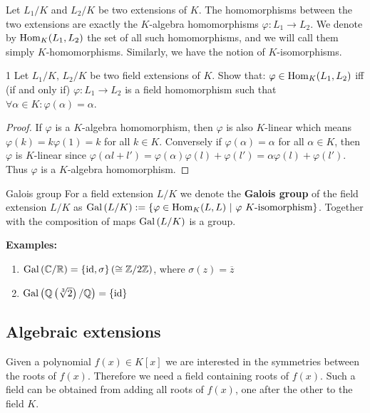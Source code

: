 \documentclass[twoside = false,	%
		headsepline,		%
		parskip = true,
		]{scrbook}						%
\begin{document}
        Let $L_1/K$ and $L_2/K$ be two extensions of $K$. The homomorphisms between the two extensions are exactly the $K$-algebra homomorphisms $\varphi: L_1 \rightarrow L_2$. We denote by $\mathrm{Hom}_K(L_1,L_2)$ the set of all such homomorphisms, and we will call them simply $K$-homomorphisms. Similarly, we have the notion of $K$-isomorphisms.
        
        \begin{exercise}{}{1}
                Let $L_1/K, \, L_2/K$ be two field extensions of $K$. Show that:
                $\varphi \in \mathrm{Hom}_K(L_1,L_2)$ iff (if and only if) $\varphi:L_1 \rightarrow L_2$ is a field homomorphism such that $\forall \alpha \in K: \varphi(\alpha) = \alpha$.
        \end{exercise}
        \begin{proof}
            If $\varphi$ is a $K$-algebra homomorphism, then $\varphi$ is also $K$-linear which means $\varphi(k) = k\varphi(1) = k$ for all $k \in K$. Conversely if $\varphi(\alpha)=\alpha$ for all $\alpha \in K$, then $\varphi$ is $K$-linear since $\varphi(\alpha l+l') = \varphi(\alpha) \varphi(l) + \varphi(l') = \alpha \varphi(l) + \varphi(l')$. Thus $\varphi$ is a $K$-algebra homomorphism.
        \end{proof}
        
        \begin{definition*}{Galois group}
                For a field extension $L/K$ we denote the \textbf{Galois group} of the field extension $L/K$ as $\mathrm{Gal}\left( L/K\right):= \{\varphi \in \mathrm{Hom}_K(L,L) \ | \ \varphi \ K\text{-isomorphism}\}$. Together with the composition of maps $\mathrm{Gal}\left( L/K\right)$ is a group.
        \end{definition*}
        \textbf{Examples:}
            \begin{enumerate}
                \item $\mathrm{Gal}\left( \mathbb C/\mathbb R\right) = \{\mathrm{id},\sigma\} \left(\cong \mathbb Z/2\mathbb Z\right)$, where $\sigma(z) = \overline{z}$
                \item $\mathrm{Gal}\left( \mathbb Q\left( \sqrt[3]{2}\right)/\mathbb Q\right) = \{\mathrm{id}\}$
            \end{enumerate}
        
    \subsection{Algebraic extensions}
        Given a polynomial $f(x) \in K[x]$ we are interested in the symmetries between the roots of $f(x)$. Therefore we need a field containing roots of $f(x)$. Such a field can be obtained from adding all roots of $f(x)$, one after the other to the field $K$.
        
\end{document}
